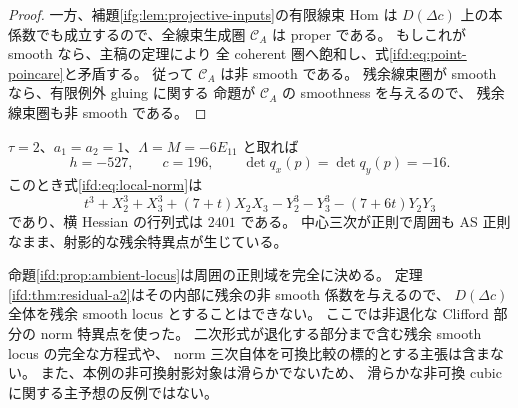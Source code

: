 \begin{proof}
一方、補題\ref{ifg:lem:projective-inputs}の有限線束 Hom は
$D(\Delta c)$ 上の本係数でも成立するので、全線束生成圏 $\mathcal C_A$ は proper である。
もしこれが smooth なら、主稿の定理により
全 coherent 圏へ飽和し、式\eqref{ifd:eq:point-poincare}と矛盾する。
従って $\mathcal C_A$ は非 smooth である。
残余線束圏が smooth なら、有限例外 gluing に関する
命題が $\mathcal C_A$ の smoothness を与えるので、
残余線束圏も非 smooth である。
\end{proof}

\begin{example}[有理数係数の特異点]
\label{ifd:ex:rational-a2}
$\tau=2$、$a_1=a_2=1$、$\Lambda=M=-6E_{11}$ と取れば
\[
       h=-527,\qquad c=196,\qquad
       \det q_x(p)=\det q_y(p)=-16.
\]
このとき式\eqref{ifd:eq:local-norm}は
\[
 t^3+X_2^3+X_3^3+(7+t)X_2X_3
       -Y_2^3-Y_3^3-(7+6t)Y_2Y_3
\]
であり、横 Hessian の行列式は $2401$ である。
中心三次が正則で周囲も AS 正則なまま、射影的な残余特異点が生じている。
\end{example}

\begin{remark}[判定の範囲]
\label{ifd:rem:scope}
命題\ref{ifd:prop:ambient-locus}は周囲の正則域を完全に決める。
定理\ref{ifd:thm:residual-a2}はその内部に残余の非 smooth 係数を与えるので、
$D(\Delta c)$ 全体を残余 smooth locus とすることはできない。
ここでは非退化な Clifford 部分の norm 特異点を使った。
二次形式が退化する部分まで含む残余 smooth locus の完全な方程式や、
norm 三次自体を可換比較の標的とする主張は含まない。
また、本例の非可換射影対象は滑らかでないため、
滑らかな非可換 cubic に関する主予想の反例ではない。
\end{remark}
